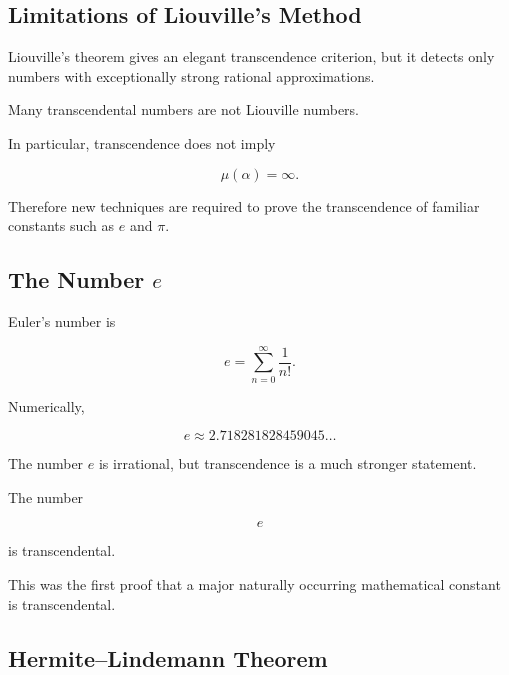 \subsection{Limitations of Liouville's Method}
\label{subsec:limitations-liouville-method}

Liouville's theorem gives an elegant transcendence criterion, but it detects
only numbers with exceptionally strong rational approximations.

Many transcendental numbers are not Liouville numbers.

In particular, transcendence does not imply

\[ \mu(\alpha)=\infty. \]

Therefore new techniques are required to prove the transcendence of familiar
constants such as \(e\) and \(\pi\).

\subsection{The Number \(e\)}
\label{subsec:e-transcendence}

Euler's number is

\[ e=\sum_{n=0}^{\infty}\frac1{n!}. \]

Numerically,

\[ e\approx2.718281828459045\ldots \]

The number \(e\) is irrational, but transcendence is a much stronger
statement.

\begin{theorem}[Hermite]
The number

\[ \boxed{e} \]

is transcendental.
\end{theorem}

This was the first proof that a major naturally occurring mathematical
constant is transcendental.

\subsection{Hermite--Lindemann Theorem}
\label{subsec:hermite-lindemann}

